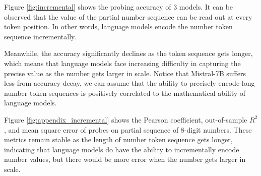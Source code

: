 \documentclass[11pt]{article}
\begin{document}
Figure \ref{fig:incremental} shows the probing accuracy of 3 models.
It can be observed that the value of the partial number sequence can be read out at every token position. In other words, language models encode the number token sequence incrementally.

Meanwhile, the accuracy significantly declines as the token sequence gets longer, which means that language models face increasing difficulty in capturing the precise value as the number gets larger in scale.
Notice that Mistral-7B suffers less from accuracy decay, we can assume that the ability to precisely encode long number token sequences is positively correlated to the mathematical ability of language models.

Figure \ref{fig:appendix_incremental} shows the Pearson coefficient, out-of-sample $R^2$, and mean square error of probes on partial sequence of 8-digit numbers.
These metrics remain stable as the length of number token sequence gets longer, indicating that language models do have the ability to incrementally encode number values, but there would be more error when the number gets larger in scale.
\end{document}
